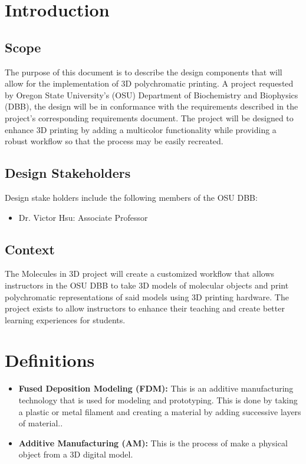 \documentclass[letterpaper, onecolumn, draftclsnofoot, 10pt, compsoc]{IEEEtran}
\begin{document}
\begin{singlespace}
\section{Introduction}
	\subsection{Scope}
    	The purpose of this document is to describe the design components that will allow for the implementation of 3D polychromatic printing. 
        A project requested by Oregon State University's (OSU) Department of Biochemistry and Biophysics (DBB), the design will be in conformance with the requirements described in the project's corresponding requirements document. 
        The project will be designed to enhance 3D printing by adding a multicolor functionality while providing a robust workflow so that the process may be easily recreated. 
    \subsection{Design Stakeholders}
    	Design stake holders include the following members of the OSU DBB:
    	\begin{itemize}
    	\item Dr. Victor Hsu: Associate Professor
    	\end{itemize}
    \subsection{Context}
    	The Molecules in 3D project will create a customized workflow that allows instructors in the OSU DBB to take 3D models of molecular objects and print polychromatic representations of said models using 3D printing hardware.
        The project exists to allow instructors to enhance their teaching and create better learning experiences for students. 
       
\section{Definitions} %
	\begin{itemize}
		\item\textbf{Fused Deposition Modeling (FDM):} This is an additive manufacturing technology that is used for modeling and prototyping. This is done by taking a plastic or metal filament and creating a material by adding successive layers of material.\cite{fusedep}.
        \item\textbf{Additive Manufacturing (AM):} This is the process of make a physical object from a 3D digital model.\cite{additiveman}
	\end{itemize}

\end{singlespace}
\end{document}
